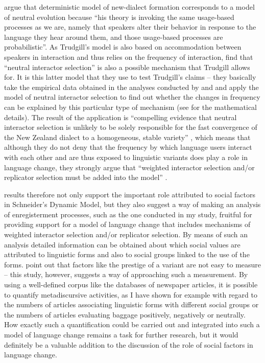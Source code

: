 \citet[270]{Baxter2009} argue that  deterministic model of new-dialect formation corresponds to a model of neutral evolution because “his theory is invoking the same usage-based processes as we are, namely that speakers alter their behavior in response to the language they hear around them, and those usage-based processes are probabilistic”. As Trudgill’s model is also based on accommodation between speakers in interaction and thus relies on the frequency of interaction, \citet[271]{Baxter2009} find that “neutral interactor selection” is also a possible mechanism that Trudgill allows for. It is this latter model that they use to test Trudgill’s claims – they basically take the empirical data obtained in the analyses conducted by \citet{Trudgill2004} and \citet{Gordon2004} and apply the model of neutral interactor selection to find out whether the changes in frequency can be explained by this particular type of mechanism (see \citealt{Baxter2009} for the mathematical details). The result of the application is “compelling evidence that neutral interactor selection is unlikely to be solely responsible for the fast convergence of the New Zealand dialect to a homogeneous, stable variety” \citep[284]{Baxter2009}, which means that although they do not deny that the frequency by which language users interact with each other and are thus exposed to linguistic variants does play a role in language change, they strongly argue that “weighted interactor selection and/or replicator selection must be added into the model” \citep[291]{Baxter2009}.

 results therefore not only support the important role attributed to social factors in Schneider’s Dynamic Model, but they also suggest a way of making an analysis of enregisterment processes, such as the one conducted in my study, fruitful for providing support for a model of language change that includes mechanisms of weighted interactor selection and/or replicator selection. By means of such an analysis detailed information can be obtained about which social values are attributed to linguistic forms and also to social groups linked to the use of the forms. \citet[269--270]{Baxter2009} point out that factors like the prestige of a variant are not easy to measure – this study, however, suggests a way of approaching such a measurement. By using a well-defined corpus like the databases of newspaper articles, it is possible to quantify metadiscursive activities, as I have shown for example with regard to the numbers of articles associating linguistic forms with different social groups or the numbers of articles evaluating baggage positively, negatively or neutrally. How exactly such a quantification could be carried out and integrated into such a model of language change remains a task for further research, but it would definitely be a valuable addition to the discussion of the role of social factors in language change.
